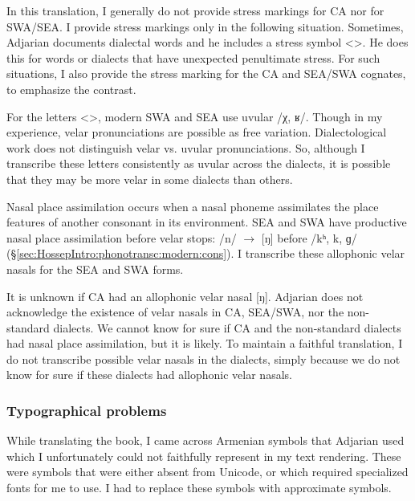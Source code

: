 \documentclass[output=paper]{langscibook}
\begin{document}
In this translation, I generally do not provide stress markings for CA nor for SWA/SEA. I provide stress markings only in the following situation. Sometimes, Adjarian documents dialectal words and he includes a stress symbol <>. He does this for words or dialects that have unexpected penultimate stress. For such situations, I also provide the stress marking for the CA and SEA/SWA cognates, to emphasize the contrast. 


For the letters <>, modern SWA and SEA use uvular /χ, ʁ/. Though in   my experience, velar pronunciations are possible as free variation. Dialectological work does not distinguish velar vs. uvular pronunciations. So, although I transcribe these letters consistently as uvular across the dialects, it is possible that they may be more velar in some dialects than others. 


Nasal place assimilation occurs when a nasal phoneme assimilates the place features of another consonant in its environment. SEA and SWA have productive nasal place assimilation before velar stops: /n/ $\rightarrow$ [ŋ] before /kʰ, k, ɡ/ (\S\ref{sec:HossepIntro:phonotransc:modern:cons}). I transcribe these allophonic velar nasals for the SEA and SWA forms. 

It is unknown if CA had an allophonic velar nasal [ŋ]. Adjarian does not acknowledge the existence of velar nasals in CA, SEA/SWA, nor the non-standard dialects. We cannot know for sure if CA and the non-standard dialects had nasal place assimilation, but it is likely. To maintain a faithful translation, I do not transcribe   possible velar nasals in the dialects, simply because we do not know for sure if these dialects had allophonic velar nasals. 

\subsubsection{	Typographical problems}\label{sec:HossepIntro:phonotransc:adj:typograph}

While translating the book, I came across Armenian symbols that Adjarian used which I unfortunately could not faithfully represent in my text rendering. These were symbols that were either absent from Unicode, or which required specialized fonts for me to use. I had to replace these symbols with approximate symbols. 
\end{document}
